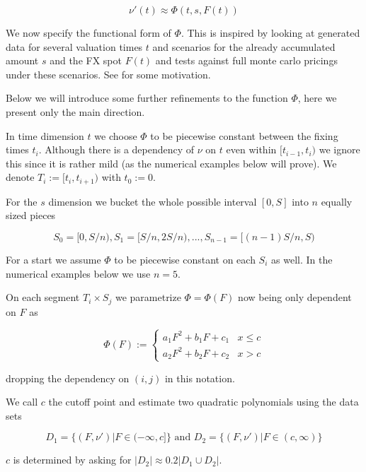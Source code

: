 \documentclass{amsart}
\theoremstyle{plain}
\numberwithin{equation}{section}
\begin{document}
\begin{equation}
\nu'(t) \approx \Phi(t,s,F(t)) 
\end{equation}

We now specify the functional form of $\Phi$. This is inspired by looking at generated data for several valuation times $t$ and scenarios for the already accumulated amount $s$ and the FX spot $F(t)$ and tests against full monte carlo pricings under these scenarios. See \cite{blog} for some motivation.

Below we will introduce some further refinements to the function $\Phi$, here we present only the main direction.

In time dimension $t$ we choose $\Phi$ to be piecewise constant between the fixing times $t_i$. Although there is a dependency of $\nu$ on $t$ even within $[t_{i-1},t_i)$ we ignore this since it is rather mild (as the numerical examples below will prove). We denote $T_i:=[t_{i},t_{i+1})$ with $t_{0} := 0$.

For the $s$ dimension we bucket the whole possible interval $[0,S]$ into $n$ equally sized pieces

\begin{equation}S_0 = [0,S/n), S_1=[S/n, 2S/n), ... , S_{n-1}=[(n-1)S/n, S)
\end{equation}

For a start we assume $\Phi$ to be piecewise constant on each $S_i$ as well. In the numerical examples below we use $n=5$.

On each segment $T_i \times S_j$ we parametrize $\Phi = \Phi(F)$ now being only dependent on $F$ as

\begin{equation}
\Phi(F) :=
\begin{cases}
a_1F^2+b_1F+c_1 & x \leq c \\
a_2F^2+b_2F+c_2 & x > c
\end{cases}
\end{equation} 

dropping the dependency on $(i,j)$ in this notation. 

We call $c$ the cutoff point and estimate two quadratic polynomials using the data sets

\begin{equation}
D_1 = \{ (F,\nu') | F \in (-\infty,c] \} \text{ and } D_2 = \{ (F,\nu') | F \in (c,\infty) \}
\end{equation}

$c$ is determined by asking for $|D_2| \approx 0.2 |D_1 \cup D_2|$.
\end{document}

